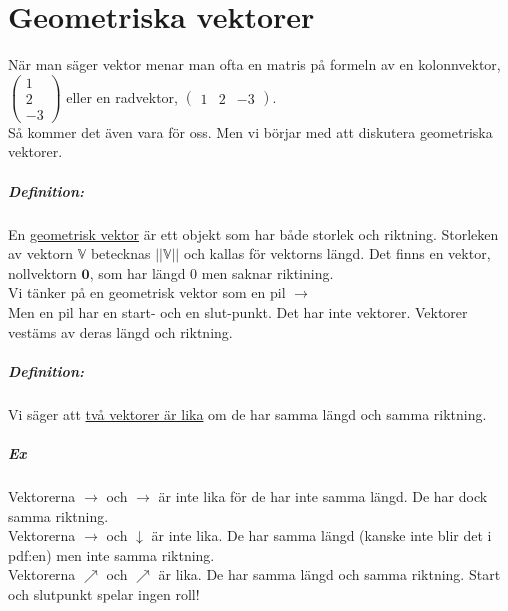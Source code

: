 \chapter{Geometriska vektorer}
    När man säger vektor menar man ofta en matris på formeln av en kolonnvektor, $
    \begin{pmatrix}
        1\\ 2\\ -3
    \end{pmatrix}
    $ eller en radvektor, $\begin{pmatrix}1 & 2 & -3\end{pmatrix}$.
    \\Så kommer det även vara för oss. Men vi börjar med att diskutera geometriska vektorer.

    \paragraph{Definition:} En \underline{geometrisk vektor} är ett objekt som har både storlek och riktning. 
    Storleken av vektorn $\mathbb{V}$ betecknas $||\mathbb{V}||$ och kallas för vektorns längd.
    Det finns en vektor, nollvektorn $\bm{0}$, som har längd 0 men saknar riktining.
    ~\\
    Vi tänker på en geometrisk vektor som en pil $\longrightarrow$
    \\Men en pil har en start- och en slut-punkt. Det har inte vektorer.
    Vektorer vestäms av deras längd och riktning.

    \paragraph{Definition:} Vi säger att \underline{två vektorer är lika} om de har samma längd och samma riktning.
    
    \paragraph{Ex} Vektorerna $\longrightarrow$ och $\rightarrow $ är inte lika för de har inte samma längd.
    De har dock samma riktning.\\
    Vektorerna $\rightarrow  $ och $\downarrow $ är inte lika. De har samma längd (kanske inte blir det i pdf:en) men inte samma riktning.\\
    Vektorerna $\nearrow $ och $\nearrow $ är lika. De har samma längd och samma riktning.
    Start och slutpunkt spelar ingen roll!
    

